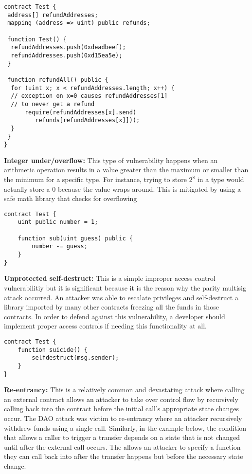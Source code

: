 \begin{lstlisting}[basicstyle=\small]
contract Test {
 address[] refundAddresses;
 mapping (address => uint) public refunds;

 function Test() {
  refundAddresses.push(0xdeadbeef); 
  refundAddresses.push(0xd15ea5e);
 }

 function refundAll() public {
  for (uint x; x < refundAddresses.length; x++) {
  // exception on x=0 causes refundAddresses[1]
  // to never get a refund
      require(refundAddresses[x].send(
         refunds[refundAddresses[x]]));
  }
 }
}
\end{lstlisting}
\textbf{Integer under/overflow:} This type of vulnerability happens when an arithmetic operation results in a value greater than the maximum or smaller than the minimum for a specific type.
For instance, trying to store $2^8$ in a  type would actually store a 0 because the value wraps around.
This is mitigated by using a safe math library that checks for overflowing
\begin{lstlisting}[basicstyle=\small]
contract Test {
    uint public number = 1;

    function sub(uint guess) public {
        number -= guess;
    }
}
\end{lstlisting}
\textbf{Unprotected self-destruct: } This is a simple improper access control vulnerabilitiy but it is significant because it is the reason why the parity multisig attack occurred.
An attacker was able to escalate privileges and self-destruct a library imported by many other contracts freezing all the funds in those contracts.
In order to defend against this vulnerability, a developer should implement proper access controls if needing this functionality at all.
\begin{lstlisting}[basicstyle=\small]
contract Test {
    function suicide() {
        selfdestruct(msg.sender);
    }
}
\end{lstlisting}
\textbf{Re-entrancy: } This is a relatively common and devastating attack where calling an external contract allows an attacker to take over control flow by recursively calling back into the contract before the initial call's appropriate state changes occur.
The DAO attack was victim to re-entrancy where an attacker recursively withdrew funds using a single call.
Similarly, in the example below, the condition that allows a caller to trigger a transfer depends on a state that is not changed until after the external call occurs.
The  allows an attacker to specify a function they can call back into after the transfer happens but before the necessary state change.
